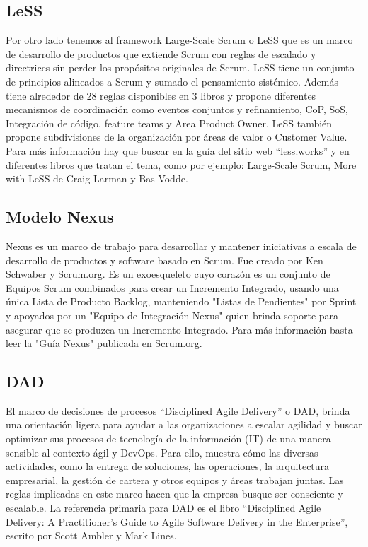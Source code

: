 \subsection{LeSS}

Por otro lado tenemos al framework Large-Scale Scrum o LeSS que  es un marco de desarrollo de productos que extiende Scrum con reglas de escalado y directrices sin perder los propósitos originales de Scrum. LeSS tiene un conjunto de principios alineados a Scrum y sumado el pensamiento sistémico. Además tiene alrededor de 28 reglas disponibles en 3 libros y propone diferentes mecanismos de coordinación como eventos conjuntos y refinamiento, CoP, SoS, Integración de código, feature teams y Area Product Owner. LeSS también propone subdivisiones de la organización por áreas de valor o Customer Value. Para más información hay que buscar en la guía del sitio web “less.works” y en diferentes libros que tratan el tema, como por ejemplo: Large-Scale Scrum, More with LeSS de Craig Larman y Bas Vodde.

\subsection{Modelo Nexus}

Nexus es un marco de trabajo para desarrollar y mantener iniciativas a escala de desarrollo de productos y software basado en Scrum. Fue creado por Ken Schwaber y Scrum.org. Es un exoesqueleto cuyo corazón es un conjunto de Equipos Scrum combinados para crear un Incremento Integrado, usando una única Lista de Producto Backlog, manteniendo "Listas de Pendientes" por Sprint y apoyados por un "Equipo de Integración Nexus" quien brinda soporte para asegurar que se produzca un Incremento Integrado. Para más información basta leer la "Guía Nexus" publicada en Scrum.org.

\subsection{DAD}

El marco de decisiones de procesos “Disciplined Agile Delivery” o DAD, brinda una orientación ligera para ayudar a las organizaciones a escalar agilidad y buscar optimizar sus procesos de tecnología de la información (IT) de una manera sensible al contexto ágil y DevOps. Para ello, muestra cómo las diversas actividades, como la entrega de soluciones, las operaciones, la arquitectura empresarial, la gestión de cartera y otros equipos y áreas trabajan juntas. Las reglas implicadas en este marco hacen que la empresa busque ser consciente y escalable. La referencia primaria para DAD es el libro “Disciplined Agile Delivery: A Practitioner's Guide to Agile Software Delivery in the Enterprise”,  escrito por Scott Ambler y Mark Lines.
